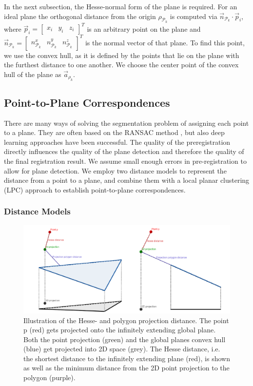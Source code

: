 In the next subsection, the Hesse-normal form of the plane is required.
For an ideal plane the orthogonal distance from the origin $\rho_{\mathcal{P}_k}$ is computed via $\vec{n}_{\mathcal{P}_k}\cdot\vec{p}_i$, where $\vec{p}_i = \begin{bmatrix}x_i&y_i&z_i\end{bmatrix}^T$ is an arbitrary point on the plane and $\vec{n}_{\mathcal{P}_k} = \begin{bmatrix}n_{\mathcal{P}_k}^x&n_{\mathcal{P}_k}^y&n_{\mathcal{P}_k}^z\end{bmatrix}^T$ is the normal vector of that plane.
To find this point, we use the convex hull, as it is defined by the points that lie on the plane with the furthest distance to one another.
We choose the center point of the convex hull of the plane as $\vec{a}_{\rho_k}$.

\subsection{Point-to-Plane Correspondences}\label{sec:point-to-plane-correspondences}


There are many ways of solving the segmentation problem of assigning each point to a plane. They are often based on the RANSAC method \cite{Honti2018}, \cite{Gaspers2011} but also deep learning approaches \cite{Engelmann2018} have been successful.
The quality of the preregistration directly influences the quality of the plane detection and therefore the quality of the final registration result.
We assume small enough errors in pre-registration to allow for plane detection.
We employ two distance models to represent the distance from a point to a plane, and combine them with a local planar clustering (LPC) approach to establish point-to-plane correspondences.

\subsubsection{Distance Models}

\begin{figure}
	\centering
	\includegraphics[width=\textwidth]{images/project}
	\caption{Illustration of the Hesse- and polygon projection distance. The point p (red) gets projected onto the infinitely extending global plane. Both the point projection (green) and the global planes convex hull (blue) get projected into 2D space (grey). The Hesse distance, i.e. the shortest distance to the infinitely extending plane (red), is shown as well as the minimum distance from the 2D point projection to the polygon (purple).}
	\label{fig:proj}
\end{figure}

